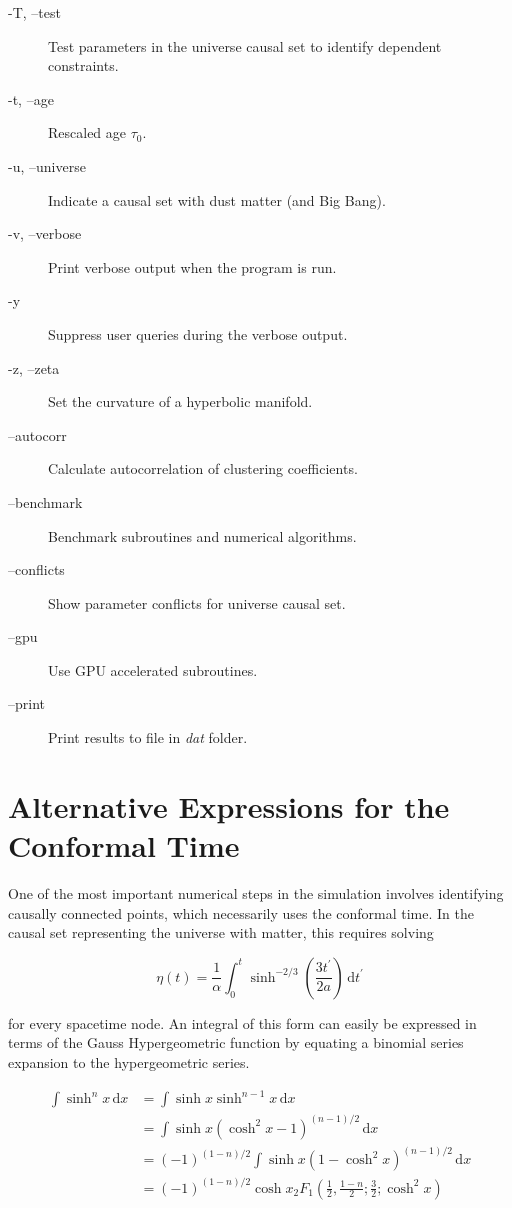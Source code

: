 \documentclass[preprint,notitlepage,amsmath,amssymb,floatfix]{revtex4-1}
\begin{document}
\begin{description}
  \item[-T, --test] \tab Test parameters in the universe causal set to identify dependent constraints.
  \item[-t, --age] \tab Rescaled age $\tau_0$.
  \item[-u, --universe] \tab Indicate a causal set with dust matter (and Big Bang).
  \item[-v, --verbose] \tab Print verbose output when the program is run.
  \item[-y] \tab\tab Suppress user queries during the verbose output.
  \item[-z, --zeta] \tab Set the curvature of a hyperbolic manifold.
  \item[--autocorr] \tab Calculate autocorrelation of clustering coefficients.
  \item[--benchmark] \tab Benchmark subroutines and numerical algorithms.
  \item[--conflicts] \tab Show parameter conflicts for universe causal set.
  \item[--gpu] \tab Use GPU accelerated subroutines.
  \item[--print] \tab Print results to file in \textit{dat} folder.
\end{description}

\section{Alternative Expressions for the Conformal Time}
One of the most important numerical steps in the simulation involves identifying causally connected points, which necessarily uses the conformal time.  In the causal set representing the universe with matter, this requires solving

\begin{equation}
\eta\left(t\right) = \frac{1}{\alpha}\int_0^t\!\sinh^{-2/3}\left(\frac{3t^\prime}{2a}\right)\,\mathrm dt^\prime
\end{equation}

\noindent for every spacetime node.  An integral of this form can easily be expressed in terms of the Gauss Hypergeometric function by equating a binomial series expansion to the hypergeometric series.

\begin{equation}
\begin{split}
\int\!\sinh^nx\,\mathrm dx &= \int\!\sinh x\sinh^{n-1}x\,\mathrm dx \\
  &= \int\!\sinh x\left(\cosh^2x-1\right)^{\left(n-1\right)/2}\,\mathrm dx \\
  &= \left(-1\right)^{\left(1-n\right)/2}\int\!\sinh x\left(1-\cosh^2x\right)^{\left(n-1\right)/2}\,\mathrm dx \\
  &= \left(-1\right)^{\left(1-n\right)/2}\cosh x{}_2F_1\left(\frac{1}{2},\frac{1-n}{2};\frac{3}{2};\cosh^2x\right)
\end{split}
\end{equation}
\end{document}

